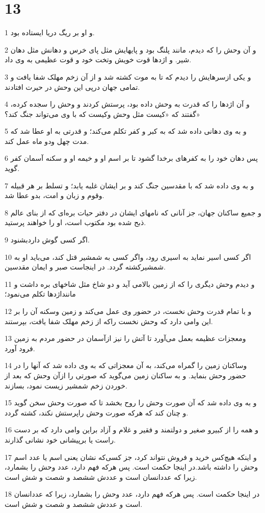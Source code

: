 \chapter{13}

\par 1 و او بر ریگ دریا ایستاده بود.
\par 2 و آن وحش را که دیدم، مانند پلنگ بود و پایهایش مثل پای خرس و دهانش مثل دهان شیر. و اژدها قوت خویش وتخت خود و قوت عظیمی به وی داد.
\par 3 و یکی ازسرهایش را دیدم که تا به موت کشته شد و از آن زخم مهلک شفا یافت و تمامی جهان در‌پی این وحش در حیرت افتادند.
\par 4 و آن اژدها را که قدرت به وحش داده بود، پرستش کردند و وحش را سجده کرده، گفتند که «کیست مثل وحش وکیست که با وی می‌تواند جنگ کند؟»
\par 5 و به وی دهانی داده شد که به کبر و کفر تکلم می‌کند؛ و قدرتی به او عطا شد که مدت چهل ودو ماه عمل کند.
\par 6 پس دهان خود را به کفرهای برخدا گشود تا بر اسم او و خیمه او و سکنه آسمان کفر گوید.
\par 7 و به وی داده شد که با مقدسین جنگ کند و بر ایشان غلبه یابد؛ و تسلط بر هر قبیله وقوم و زبان و امت، بدو عطا شد.
\par 8 و جمیع ساکنان جهان، جز آنانی که نامهای ایشان در دفتر حیات بره‌ای که از بنای عالم ذبح شده بود مکتوب است، او را خواهند پرستید.
\par 9 اگر کسی گوش داردبشنود.
\par 10 اگر کسی اسیر نماید به اسیری رود، واگر کسی به شمشیر قتل کند، می‌باید او به شمشیرکشته گردد. در اینجاست صبر و ایمان مقدسین.
\par 11 و دیدم وحش دیگری را که از زمین بالامی آید و دو شاخ مثل شاخهای بره داشت و ماننداژدها تکلم می‌نمود؛
\par 12 و با تمام قدرت وحش نخست، در حضور وی عمل می‌کند و زمین وسکنه آن را بر این وامی دارد که وحش نخست راکه از زخم مهلک شفا یافت، بپرستند.
\par 13 ومعجزات عظیمه بعمل می‌آورد تا آتش را نیز ازآسمان در حضور مردم به زمین فرود آورد.
\par 14 وساکنان زمین را گمراه می‌کند، به آن معجزاتی که به وی داده شد که آنها را در حضور وحش بنماید. و به ساکنان زمین می‌گوید که صورتی را ازآن وحش که بعد از خوردن زخم شمشیر زیست نمود، بسازند.
\par 15 و به وی داده شد که آن صورت وحش را روح بخشد تا که صورت وحش سخن گوید و چنان کند که هر‌که صورت وحش راپرستش نکند، کشته گردد.
\par 16 و همه را از کبیرو صغیر و دولتمند و فقیر و غلام و آزاد براین وامی دارد که بر دست راست یا برپیشانی خود نشانی گذارند.
\par 17 و اینکه هیچ‌کس خرید و فروش نتواند کرد، جز کسی‌که نشان یعنی اسم یا عدد اسم وحش را داشته باشد.در اینجا حکمت است. پس هر‌که فهم دارد، عدد وحش را بشمارد، زیرا که عددانسان است و عددش ششصد و شصت و شش است.
\par 18 در اینجا حکمت است. پس هر‌که فهم دارد، عدد وحش را بشمارد، زیرا که عددانسان است و عددش ششصد و شصت و شش است.

